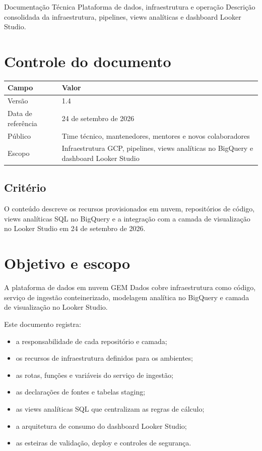 \documentclass[11pt,a4paper]{article}
\begin{document}
\GemCover
  {Documentação Técnica}
  {Plataforma de dados, infraestrutura e operação}
  {Descrição consolidada da infraestrutura, pipelines, views analíticas e dashboard Looker Studio.}

\section*{Controle do documento}

\begin{tabularx}{\textwidth}{L{35mm}Y}
\toprule
\textbf{Campo} & \textbf{Valor} \\
\midrule
Versão & 1.4 \\
Data de referência & 24 de setembro de 2026 \\
Público & Time técnico, mantenedores, mentores e novos colaboradores \\
Escopo & Infraestrutura GCP, pipelines, views analíticas no BigQuery e dashboard Looker Studio \\
\bottomrule
\end{tabularx}

\subsection*{Critério}

O conteúdo descreve os recursos provisionados em nuvem, repositórios de código,
views analíticas SQL no BigQuery e a integração com a camada de visualização
no Looker Studio em 24 de setembro de 2026.

\clearpage
\tableofcontents
\clearpage

\section{Objetivo e escopo}

A plataforma de dados em nuvem GEM Dados cobre infraestrutura como código, serviço
de ingestão conteinerizado, modelagem analítica no BigQuery e camada de visualização
no Looker Studio.

Este documento registra:

\begin{itemize}
  \item a responsabilidade de cada repositório e camada;
  \item os recursos de infraestrutura definidos para os ambientes;
  \item as rotas, funções e variáveis do serviço de ingestão;
  \item as declarações de fontes e tabelas staging;
  \item as views analíticas SQL que centralizam as regras de cálculo;
  \item a arquitetura de consumo do dashboard Looker Studio;
  \item as esteiras de validação, deploy e controles de segurança.
\end{itemize}
\end{document}
